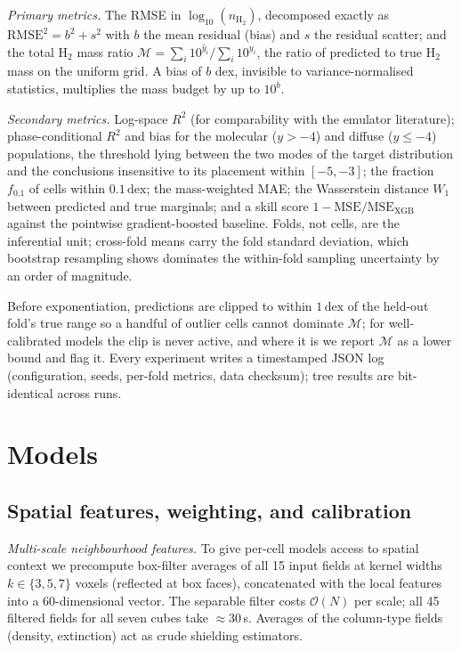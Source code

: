 \documentclass[fleqn,usenatbib]{rasti}
\newcommand{\logn}{\log_{10}(n_{\mathrm{H_2}})}
\newcommand{\dex}{\,\text{dex}}
\newcommand{\Rsq}{R^2}
\newcommand{\Mratio}{\mathcal{M}}
\begin{document}
\emph{Primary metrics.} The RMSE in \(\logn\), decomposed exactly as
\(\mathrm{RMSE}^2 = b^2 + s^2\) with \(b\) the mean residual (bias) and
\(s\) the residual scatter; and the total H\(_2\) mass ratio
\(\Mratio = \sum_i 10^{\hat y_i} / \sum_i 10^{y_i}\), the ratio of
predicted to true H\(_2\) mass on the uniform grid. A bias of \(b\) dex,
invisible to variance-normalised statistics, multiplies the mass budget
by up to \(10^{b}\).

\emph{Secondary metrics.} Log-space \(\Rsq\) (for comparability with the
emulator literature); phase-conditional \(\Rsq\) and bias for the
molecular (\(y > -4\)) and diffuse (\(y \le -4\)) populations, the
threshold lying between the two modes of the target distribution and the
conclusions insensitive to its placement within \([-5,-3]\); the fraction
\(f_{0.1}\) of cells within \(0.1\dex\); the mass-weighted MAE; the
Wasserstein distance \(W_1\) between predicted and true marginals; and a
skill score \(1 - \mathrm{MSE}/\mathrm{MSE_{XGB}}\) against the pointwise
gradient-boosted baseline. Folds, not cells, are the inferential unit;
cross-fold means carry the fold standard deviation, which bootstrap
resampling shows dominates the within-fold sampling uncertainty by an
order of magnitude.

Before exponentiation, predictions are clipped to within \(1\dex\) of the
held-out fold's true range so a handful of outlier cells cannot dominate
\(\Mratio\); for well-calibrated models the clip is never active, and
where it is we report \(\Mratio\) as a lower bound and flag it. Every
experiment writes a timestamped JSON log (configuration, seeds, per-fold
metrics, data checksum); tree results are bit-identical across runs.

\section{Models}
\label{sec:methods}

\subsection{Spatial features, weighting, and calibration}
\label{sec:ingredients}

\emph{Multi-scale neighbourhood features.} To give per-cell models
access to spatial context we precompute box-filter averages of all 15
input fields at kernel widths \(k \in \{3,5,7\}\) voxels (reflected at
box faces), concatenated with the local features into a 60-dimensional
vector. The separable filter costs \(\mathcal{O}(N)\) per scale;
all 45 filtered fields for all seven cubes take \(\approx\)30\,s.
Averages of the column-type fields (density, extinction) act as crude
shielding estimators.
\end{document}
